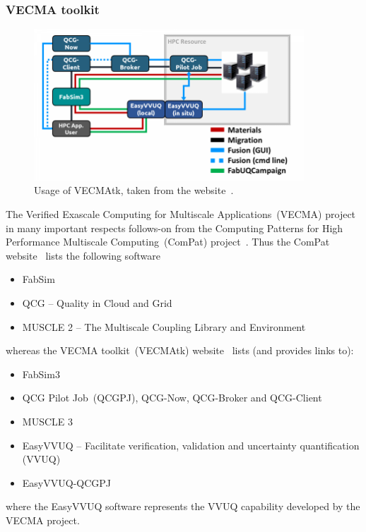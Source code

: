 \subsubsection{VECMA toolkit}\label{sec:vecmatk}
\begin{figure}
\centerline{\includegraphics[width=0.9\textwidth]{../png/vecmatk}}
\caption{Usage of VECMAtk, taken from the website~\cite{vecmatkwebsite}. 
\label{fig:vecma}}
\end{figure}

The Verified Exascale Computing for Multiscale Applications~(VECMA) project~\cite{vecmawebsite}
in many important respects follows-on from the Computing Patterns for High
Performance Multiscale Computing~(ComPat) project~\cite{compatwebsite}.
Thus the ComPat website~\cite{compatswwebsite} lists the following software
\begin{itemize}
\item FabSim
\item QCG -- Quality in Cloud and Grid
\item MUSCLE 2 -- The Multiscale Coupling Library and Environment
\end{itemize}

whereas the VECMA toolkit~(VECMAtk) website~\cite{vecmatkwebsite} lists 
(and provides links to):
\begin{itemize}
\item FabSim3
\item QCG Pilot Job~(QCGPJ), QCG-Now, QCG-Broker  and QCG-Client
\item MUSCLE 3
\item EasyVVUQ --  Facilitate verification, validation and uncertainty quantification (VVUQ) 
\item EasyVVUQ-QCGPJ
\end{itemize}
where the EasyVVUQ software represents the VVUQ capability developed by the
VECMA project.

